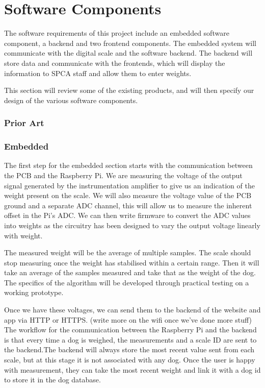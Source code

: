 
\chapter{Software Components}

The software requirements of this project include an embedded software component, a backend and two frontend components. The embedded system will communicate with the digital scale and the software backend. The backend will store data and communicate with the frontends, which will display the information to SPCA staff and allow them to enter weights. 

This section will review some of the existing products, and will then specify our design of the various software components.

\subsection{Prior Art}

\subsection{Embedded}
The first step for the embedded section starts with the communication between the PCB and the Raspberry Pi. We are measuring the voltage of the output signal generated by the instrumentation amplifier to give us an indication of the weight present on the scale. We will also measure the voltage value of the PCB ground and a separate ADC channel, this will allow us to measure the inherent offset in the Pi’s ADC. We can then write firmware to convert the ADC values into weights as the circuitry has been designed to vary the output voltage linearly with weight. 

The measured weight will be the average of multiple samples. The scale should stop measuring once the weight has stabilised within a certain range. Then it will take an average of the samples measured and take that as the weight of the dog. The specifics of the algorithm will be developed through practical testing on a working prototype. 

Once we have these voltages, we can send them to the backend of the website and app via HTTP or HTTPS. (write more on the wifi once we’ve done more stuff)
The workflow for the communication between the Raspberry Pi and the backend is that every time a dog is weighed, the measurements and a scale ID are sent to the backend.The backend will always store the most recent value sent from each scale, but at this stage it is not associated with any dog. Once the user is happy with measurement, they can take the most recent weight and link it with a dog id to store it in the dog database.

